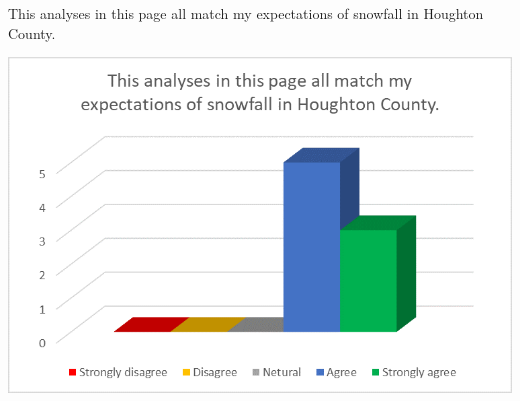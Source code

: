 \documentclass[]{article}
\begin{document}
This analyses in this page all match my expectations of snowfall in
Houghton County.

\begin{center}\includegraphics[width=0.8\linewidth]{Ex2/figures/q13} \end{center}
\end{document}
